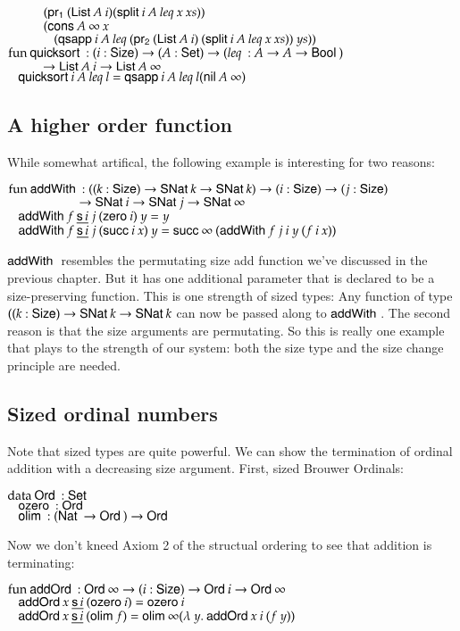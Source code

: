 \begin{bsp}
$\spcx	(\pra (\List A\: i) (\pivot i\: A\: \lleq x\: xs))$\\
$\spcx	(\cons A\: \infty \: x\: $\\
$\spcx	\spc   (\qsapp i\: A\: \lleq (\prb (\List A\: i) \: (\pivot i\: A\: \lleq x\: xs))\: ys))$\\
$\mathrm{fun}\: \mathsf{quicksort}\: : (i : \mathsf{Size} ) \rightarrow (A : \mathsf{Set} ) \rightarrow (\mathit{leq}\: : A \rightarrow A \rightarrow \mathsf{Bool}\:)$\\ 
$\spcx	\ra \List A\: i \ra \List A\: \infty$\\
$\hspace*{3mm} \mathsf{quicksort}\: i\: A\: \mathit{leq}\: l = \mathsf{qsapp}\: i\: A\: \mathit{leq}\: l (\mathsf{nil}\: A\: \infty)$ 
\end{bsp}

\subsection{A higher order function}
While somewhat artifical, the following example is interesting for two reasons:
\begin{bsp}
$\mathrm{fun}\: \mathsf{addWith}\: : ((k : \mathsf{Size} ) \rightarrow \mathsf{SNat}\: k \rightarrow \mathsf{SNat}\: k ) \rightarrow (i : \mathsf{Size} ) \rightarrow (j : \mathsf{Size} ) $\\
$\spcx \spcx \ra  \SNat i \ra \SNat j \ra \SNat \infty $\\
$\hspace*{3mm} \mathsf{addWith}\: f \: \underline{\mathsf{s}\, i} \: j \: (\mathsf{zero}\: i) \: y = y $ \\
$\hspace*{3mm} \mathsf{addWith}\: f \: \underline{\mathsf{s}\, i} \: j \: (\mathsf{succ}\: i \: x) \: y = \mathsf{succ}\: \infty \: (\mathsf{addWith}\: f \: j \: i \: y \: (f \: i \: x))$
\end{bsp}
$\mathsf{addWith}\:$ resembles the permutating size add function we've discussed in the previous chapter.
But it has one additional parameter that is declared to be a size-preserving function.
This is one strength of sized types: Any function of type  $ ((k : \mathsf{Size} ) \rightarrow \mathsf{SNat}\: k \rightarrow \mathsf{SNat}\: k $ can now
be passed along to $\mathsf{addWith}\:$.
The second reason is that the size arguments are permutating. 
So this is really one example that plays to the strength of our system: both the size type and the size change principle are needed.
\subsection{Sized ordinal numbers}
Note that sized types are quite powerful. 
We can show the termination of ordinal addition with a decreasing size argument.
First, sized Brouwer Ordinals:
\begin{bsp}
$\mathrm{data}\: \mathsf{Ord}\: : \mathsf{Set}$ \\
$\hspace*{3mm} \mathsf{ozero}\: : \mathsf{Ord}\: $\\
$\hspace*{3mm} \mathsf{olim}\: : (\mathsf{Nat}\: \rightarrow \mathsf{Ord}\: ) \rightarrow \mathsf{Ord}\: $
\end{bsp}
Now we don't kneed Axiom 2 of the structual ordering to see that addition is terminating:
\begin{bsp}
$\mathrm{fun}\: \mathsf{addOrd}\: : \mathsf{Ord}\: \infty \rightarrow ( i : \mathsf{Size} ) \rightarrow{\mathsf{Ord}\:i \rightarrow\mathsf{Ord}\:\infty }$\\
$\hspace*{3mm} \mathsf{addOrd}\: x\: \underline{\mathsf{s}\, i}\: (\mathsf{ozero}\: i) = \mathsf{ozero}\: i $\\
$\hspace*{3mm} \mathsf{addOrd}\: x\: \underline{\mathsf{s}\, i}\: (\mathsf{olim}\: f)  = \mathsf{olim}\: \infty ( \lambda\: y .\: \mathsf{addOrd}\:  x \: i \: (f \: y))  $
\end{bsp}

